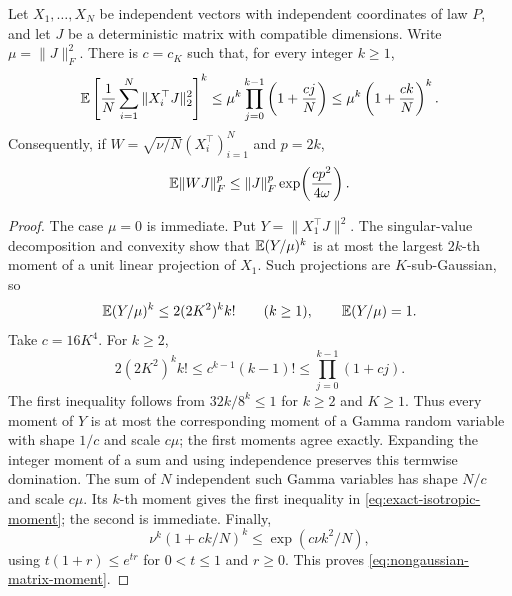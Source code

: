 \begin{lemma}
\label{lem:exact-isotropic-moments}
Let $X_1,\ldots,X_N$ be independent vectors with independent
coordinates of law $P$, and let $J$ be a deterministic matrix with
compatible dimensions. Write $\mu=\|J\|_F^2$. There is $c=c_K$ such
that, for every integer $k\ge1$,
\begin{equation}
 \mathbb E\left[\frac1N\sum_{i=1}^N\|X_i^\top J\|_2^2\right]^k
 \le \mu^k\prod_{j=0}^{k-1}\left(1+\frac{cj}{N}\right)
 \le\mu^k\left(1+\frac{ck}{N}\right)^k.
 \label{eq:exact-isotropic-moment}
\end{equation}
Consequently, if $W=\sqrt{\nu/N}(X_i^\top)_{i=1}^N$ and $p=2k$,
\begin{equation}
 \mathbb E\|WJ\|_F^p
 \le \|J\|_F^p\exp\!\left(\frac{cp^2}{4\omega}\right).
 \label{eq:nongaussian-matrix-moment}
\end{equation}
\end{lemma}
\begin{proof}
The case $\mu=0$ is immediate. Put $Y=\|X_1^\top J\|^2$.
The singular-value decomposition and convexity show that
$\mathbb E(Y/\mu)^k$ is at most the largest $2k$-th moment of a unit linear
projection of $X_1$. Such projections are $K$-sub-Gaussian, so
\[
 \mathbb E(Y/\mu)^k\le2(2K^2)^k k!\qquad(k\ge1),
 \qquad \mathbb E(Y/\mu)=1.
\]
Take $c=16K^4$. For $k\ge2$,
\[
 2(2K^2)^k k!
 \le c^{k-1}(k-1)!
 \le\prod_{j=0}^{k-1}(1+cj).
\]
The first inequality follows from
$32k/8^k\le1$ for $k\ge2$ and $K\ge1$.
Thus every moment of $Y$ is at most the corresponding moment of a
Gamma random variable with shape $1/c$ and scale $c\mu$; the first
moments agree exactly. Expanding the integer moment of a sum and
using independence preserves this termwise domination. The sum of
$N$ independent such Gamma variables has shape $N/c$ and scale
$c\mu$. Its $k$-th moment gives the first inequality in
\eqref{eq:exact-isotropic-moment}; the second is immediate.
Finally,
\[
 \nu^k(1+ck/N)^k
 \le\exp(c\nu k^2/N),
\]
using $t(1+r)\le e^{tr}$ for $0<t\le1$ and $r\ge0$.
This proves \eqref{eq:nongaussian-matrix-moment}.
\end{proof}


